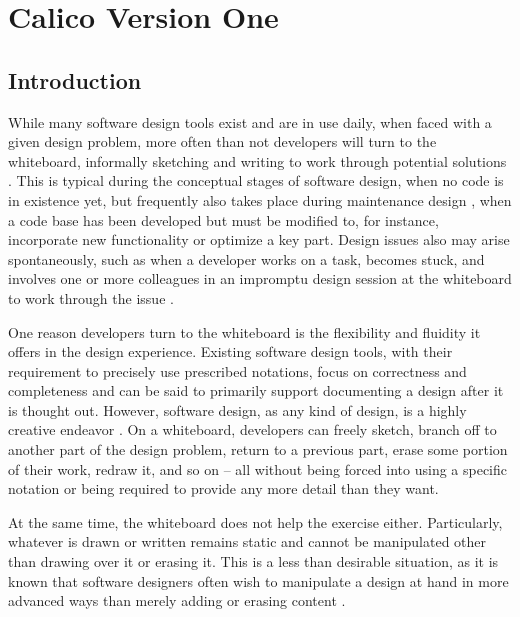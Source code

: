 \chapter{Calico Version One}
\label{chapter:calico-version-one}

\section{Introduction}
\label{intro}
While many software design tools exist and are in use daily, when faced with a given design problem, more often than not developers will turn to the whiteboard, informally sketching and writing to work through potential solutions \citep{Cherubini,Damm,Mangano,Nickerson,Petre}. This is typical during the conceptual stages of software design, when no code is in existence yet, but frequently also takes place during maintenance design \citep{grisham}, when a code base has been developed but must be modified to, for instance, incorporate new functionality or optimize a key part. Design issues also may arise spontaneously, such as when a developer works on a task, becomes stuck, and involves one or more colleagues in an impromptu design session at the whiteboard to work through the issue \citep{Cherubini}.

One reason developers turn to the whiteboard is the flexibility and fluidity it offers in the design experience. Existing software design tools, with their requirement to precisely use prescribed notations, focus on correctness and completeness and can be said to primarily support documenting a design after it is thought out. However, software design, as any kind of design, is a highly creative endeavor \citep{Petre,Brooks}. On a whiteboard, developers can freely sketch, branch off to another part of the design problem, return to a previous part, erase some portion of their work, redraw it, and so on – all without being forced into using a specific notation or being required to provide any more detail than they want. 

At the same time, the whiteboard does not help the exercise either. Particularly, whatever is drawn or written remains static and cannot be manipulated other than drawing over it or erasing it. This is a less than desirable situation, as it is known that software designers often wish to manipulate a design at hand in more advanced ways than merely adding or erasing content \citep{Dekela}.

